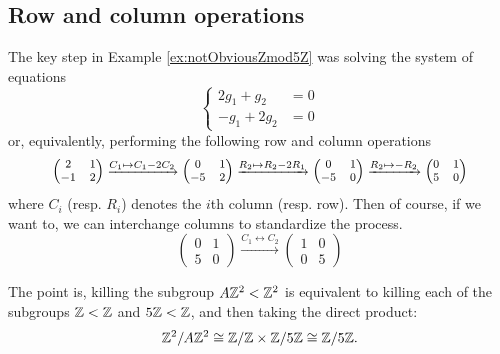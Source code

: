 \documentclass[../algebraNotesMSRI-UP2016.tex]{subfiles}
\begin{document}
\subsection[\subsecname]{Row and column operations}
\begin{frame}{\subsecname}{}
The key step in Example \ref{ex:notObviousZmod5Z} was solving the system of equations
\[
\left\{\begin{aligned}
	2g_1+g_2 &= 0 \\
	-g_1+2g_2 &= 0
	\end{aligned}
	\right.
\]
or, equivalently, performing the following row and column operations
\[\footnotesize
\begin{pmatrix}
2 & 1 \\
-1 & 2
\end{pmatrix} \xrightarrow{C_1\mapsto C_1-2C_2}
\begin{pmatrix}
0 & 1 \\
-5 & 2 
\end{pmatrix}   \xrightarrow{R_2\mapsto R_2-2R_1} 
\begin{pmatrix}
0 & 1 \\
-5 & 0 
\end{pmatrix} \xrightarrow{R_2\mapsto -R_2}
\begin{pmatrix}
0 & 1 \\
5 & 0 
\end{pmatrix}
\]
where $C_i$ (resp. $R_i$) denotes the $i$th column (resp. row).  Then of course, if we want to, we can interchange columns to standardize the process.  
\[
\begin{pmatrix}
0 & 1 \\
5 & 0 
\end{pmatrix} \xrightarrow{C_1\leftrightarrow C_2}
\begin{pmatrix}
1 & 0 \\
0 & 5 
\end{pmatrix}
\]
\end{frame}

\begin{frame}[c]
The point is, killing the subgroup $A\mathbb Z^2< \mathbb Z^2$ is equivalent to killing each of the subgroups $\mathbb Z< \mathbb Z$ and $5\mathbb Z<\mathbb Z$, and then taking the direct product:
\[
\mathbb Z^2/A\mathbb Z^2 \cong \mathbb Z/\mathbb Z\times \mathbb Z/5\mathbb Z \cong \mathbb Z/5\mathbb Z. 
\]
\end{frame}
\end{document}
